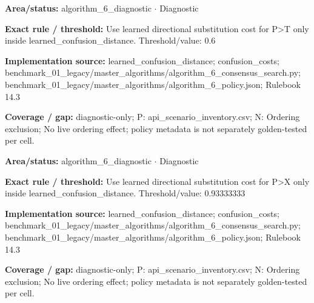 \begin{tcolorbox}[enhanced,breakable,colback=white,colframe=Muted!45,boxrule=0.45pt,arc=1.5pt,left=6pt,right=6pt,top=5pt,bottom=5pt,title={\texttt{A6-LEARNED-SUBSTITUTION-P-T}},title after break={\texttt{A6-LEARNED-SUBSTITUTION-P-T}\ (continued)},fonttitle=\headingfont\bfseries\color{Navy},coltitle=Navy]
\textbf{Area/status:} algorithm\_\allowbreak{}6\_\allowbreak{}diagnostic $\boldsymbol{\cdot}$ Diagnostic\par
\smallskip
\textbf{Exact rule / threshold:} Use learned directional substitution cost for P>T only inside learned\_\allowbreak{}confusion\_\allowbreak{}distance. Threshold/\allowbreak{}value: 0.6\par
\smallskip
\textbf{Implementation source:} learned\_\allowbreak{}confusion\_\allowbreak{}distance; confusion\_\allowbreak{}costs; benchmark\_\allowbreak{}01\_\allowbreak{}legacy/\allowbreak{}master\_\allowbreak{}algorithms/\allowbreak{}algorithm\_\allowbreak{}6\_\allowbreak{}consensus\_\allowbreak{}search.py; benchmark\_\allowbreak{}01\_\allowbreak{}legacy/\allowbreak{}master\_\allowbreak{}algorithms/\allowbreak{}algorithm\_\allowbreak{}6\_\allowbreak{}policy.json; Rulebook 14.3\par
\smallskip
\textbf{Coverage / gap:} diagnostic-only; P: api\_\allowbreak{}scenario\_\allowbreak{}inventory.csv; N: Ordering exclusion; No live ordering effect; policy metadata is not separately golden-tested per cell.
\end{tcolorbox}
\begin{tcolorbox}[enhanced,breakable,colback=white,colframe=Muted!45,boxrule=0.45pt,arc=1.5pt,left=6pt,right=6pt,top=5pt,bottom=5pt,title={\texttt{A6-LEARNED-SUBSTITUTION-P-X}},title after break={\texttt{A6-LEARNED-SUBSTITUTION-P-X}\ (continued)},fonttitle=\headingfont\bfseries\color{Navy},coltitle=Navy]
\textbf{Area/status:} algorithm\_\allowbreak{}6\_\allowbreak{}diagnostic $\boldsymbol{\cdot}$ Diagnostic\par
\smallskip
\textbf{Exact rule / threshold:} Use learned directional substitution cost for P>X only inside learned\_\allowbreak{}confusion\_\allowbreak{}distance. Threshold/\allowbreak{}value: 0.93333333\par
\smallskip
\textbf{Implementation source:} learned\_\allowbreak{}confusion\_\allowbreak{}distance; confusion\_\allowbreak{}costs; benchmark\_\allowbreak{}01\_\allowbreak{}legacy/\allowbreak{}master\_\allowbreak{}algorithms/\allowbreak{}algorithm\_\allowbreak{}6\_\allowbreak{}consensus\_\allowbreak{}search.py; benchmark\_\allowbreak{}01\_\allowbreak{}legacy/\allowbreak{}master\_\allowbreak{}algorithms/\allowbreak{}algorithm\_\allowbreak{}6\_\allowbreak{}policy.json; Rulebook 14.3\par
\smallskip
\textbf{Coverage / gap:} diagnostic-only; P: api\_\allowbreak{}scenario\_\allowbreak{}inventory.csv; N: Ordering exclusion; No live ordering effect; policy metadata is not separately golden-tested per cell.
\end{tcolorbox}
